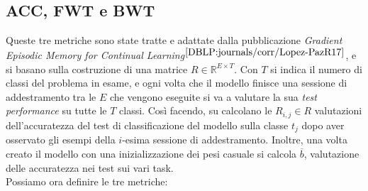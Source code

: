 \subsection{ACC, FWT e BWT}
Queste tre metriche sono state tratte e adattate dalla pubblicazione \textit{Gradient Episodic Memory for Continual Learning}$^{\cite{DBLP:journals/corr/Lopez-PazR17}}$, e si basano sulla costruzione di una matrice $R \in \mathbb{R}^{E\times T}$. Con $T$ si indica il numero di classi del problema in esame, e ogni volta che il modello finisce una sessione di addestramento tra le $E$ che vengono eseguite si va a valutare la sua \textit{test performance} su tutte le $T$ classi. Così facendo, su calcolano le $R_{i,j}\in R$ valutazioni dell'accuratezza del test di classificazione del modello sulla classe $t_j$ dopo aver osservato gli esempi della $i$-esima sessione di addestramento. Inoltre, una volta creato il modello con una inizializzazione dei pesi casuale si calcola $\overline{b}$, valutazione delle accuratezza nei test sui vari task.\\
Possiamo ora definire le tre metriche:
